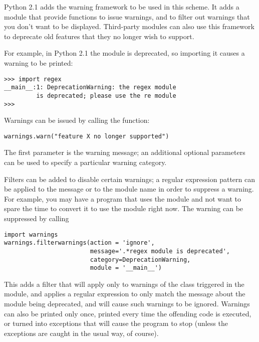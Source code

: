 \documentclass{howto}
\begin{document}
Python 2.1 adds the warning framework to be used in this scheme.  It
adds a  module that provide functions to issue
warnings, and to filter out warnings that you don't want to be
displayed. Third-party modules can also use this framework to
deprecate old features that they no longer wish to support.

For example, in Python 2.1 the  module is deprecated, so
importing it causes a warning to be printed:

\begin{verbatim}
>>> import regex
__main__:1: DeprecationWarning: the regex module
         is deprecated; please use the re module
>>>
\end{verbatim}

Warnings can be issued by calling the 
function:

\begin{verbatim}
warnings.warn("feature X no longer supported")
\end{verbatim}

The first parameter is the warning message; an additional optional
parameters can be used to specify a particular warning category.

Filters can be added to disable certain warnings; a regular expression
pattern can be applied to the message or to the module name in order
to suppress a warning.  For example, you may have a program that uses
the  module and not want to spare the time to convert it
to use the  module right now.  The warning can be
suppressed by calling

\begin{verbatim}
import warnings
warnings.filterwarnings(action = 'ignore',
                        message='.*regex module is deprecated',
                        category=DeprecationWarning,
                        module = '__main__')
\end{verbatim}

This adds a filter that will apply only to warnings of the class
 triggered in the  module,
and applies a regular expression to only match the message about the
 module being deprecated, and will cause such warnings
to be ignored.  Warnings can also be printed only once, printed every
time the offending code is executed, or turned into exceptions that
will cause the program to stop (unless the exceptions are caught in
the usual way, of course).
\end{document}
